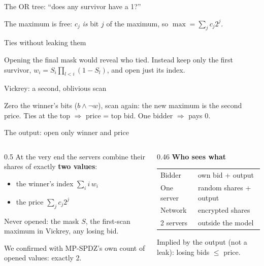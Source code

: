 \documentclass[aspectratio=169,11pt]{beamer}
\newcommand{\diagram}[2][\linewidth]{\resizebox{#1}{!}{}}
\begin{document}
\begin{frame}{The OR tree: ``does any survivor have a 1?''}
  \centering
  \diagram[0.85\linewidth]{or_tree}
  \medskip

  \small The maximum is free: $c_j$ \emph{is} bit $j$ of the maximum, so $\max = \sum_j c_j 2^j$.
\end{frame}

\begin{frame}{Ties without leaking them}
  \centering
  \diagram[0.85\linewidth]{tiebreak}
  \bigskip

  \small Opening the final mask would reveal who tied. Instead keep only the first survivor,
  $w_i = S_i \prod_{l<i}(1 - S_l)$, and open just its index.
\end{frame}

\begin{frame}{Vickrey: a second, oblivious scan}
  \centering
  \diagram[0.92\linewidth]{vickrey}
  \medskip

  \small Zero the winner's bits ($b \wedge \lnot w$), scan again: the new maximum is the second price.
  Ties at the top $\Rightarrow$ price = top bid. One bidder $\Rightarrow$ pays 0.
\end{frame}

\begin{frame}{The output: open only winner and price}
  \begin{columns}[T]
    \begin{column}{0.5\textwidth}
      At the very end the servers combine their shares of exactly \textbf{two values}:
      \begin{itemize}
        \item the winner's index $\sum_i i\, w_i$
        \item the price $\sum_j c_j 2^j$
      \end{itemize}
      Never opened: the mask $S$, the first-scan maximum in Vickrey, any losing bid.
      \medskip

      We confirmed with MP-SPDZ's own count of opened values: exactly 2.
    \end{column}
    \begin{column}{0.46\textwidth}
      \textbf{Who sees what}\\[4pt]
      \footnotesize
      \begin{tabular}{@{}p{2.0cm}p{3.9cm}@{}}
        \toprule
        Bidder & own bid + output \\
        One server & random shares + output \\
        Network & encrypted shares \\
        2 servers & outside the model \\
        \bottomrule
      \end{tabular}
      \medskip

      \normalsize
      Implied by the output (not a leak): losing bids $\le$ price.
    \end{column}
  \end{columns}
\end{frame}
\end{document}
